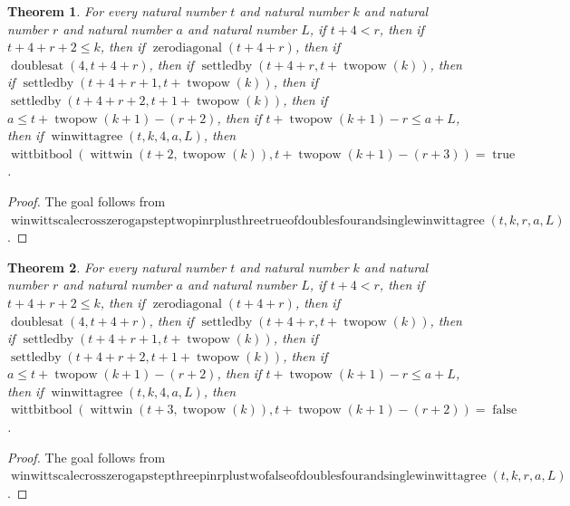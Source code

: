 \documentclass[11pt]{article}
\newtheorem{theorem}{Theorem}[section]
\theoremstyle{definition}
\begin{document}
\begin{theorem}
\label{ll:paper:winwitt-scale-cross-zero-gap-step-two-pin-r-plus-three-true-of-doubles-four-and-single-winwittagree}
For every natural number \(t\) and natural number \(k\) and natural number \(r\) and natural number \(a\) and natural number \(L\), if \(t + 4 < r\), then if \(t + 4 + r + 2 \le k\), then if \(\operatorname{zerodiagonal}(t + 4 + r)\), then if \(\operatorname{doublesat}(4, t + 4 + r)\), then if \(\operatorname{settledby}(t + 4 + r, t + \operatorname{twopow}(k))\), then if \(\operatorname{settledby}(t + 4 + r + 1, t + \operatorname{twopow}(k))\), then if \(\operatorname{settledby}(t + 4 + r + 2, t + 1 + \operatorname{twopow}(k))\), then if \(a \le t + \operatorname{twopow}(k + 1) - (r + 2)\), then if \(t + \operatorname{twopow}(k + 1) - r \le a + L\), then if \(\operatorname{winwittagree}(t, k, 4, a, L)\), then \(\operatorname{wittbitbool}(\operatorname{wittwin}(t + 2, \operatorname{twopow}(k)), t + \operatorname{twopow}(k + 1) - (r + 3)) = \operatorname{true}\).
\end{theorem}
\begin{proof}
The goal follows from \(\operatorname{winwittscalecrosszerogapsteptwopinrplusthreetrueofdoublesfourandsinglewinwittagree}(t, k, r, a, L)\).
\end{proof}
\begin{theorem}
\label{ll:paper:winwitt-scale-cross-zero-gap-step-three-pin-r-plus-two-false-of-doubles-four-and-single-winwittagree}
For every natural number \(t\) and natural number \(k\) and natural number \(r\) and natural number \(a\) and natural number \(L\), if \(t + 4 < r\), then if \(t + 4 + r + 2 \le k\), then if \(\operatorname{zerodiagonal}(t + 4 + r)\), then if \(\operatorname{doublesat}(4, t + 4 + r)\), then if \(\operatorname{settledby}(t + 4 + r, t + \operatorname{twopow}(k))\), then if \(\operatorname{settledby}(t + 4 + r + 1, t + \operatorname{twopow}(k))\), then if \(\operatorname{settledby}(t + 4 + r + 2, t + 1 + \operatorname{twopow}(k))\), then if \(a \le t + \operatorname{twopow}(k + 1) - (r + 2)\), then if \(t + \operatorname{twopow}(k + 1) - r \le a + L\), then if \(\operatorname{winwittagree}(t, k, 4, a, L)\), then \(\operatorname{wittbitbool}(\operatorname{wittwin}(t + 3, \operatorname{twopow}(k)), t + \operatorname{twopow}(k + 1) - (r + 2)) = \operatorname{false}\).
\end{theorem}
\begin{proof}
The goal follows from \(\operatorname{winwittscalecrosszerogapstepthreepinrplustwofalseofdoublesfourandsinglewinwittagree}(t, k, r, a, L)\).
\end{proof}
\end{document}
